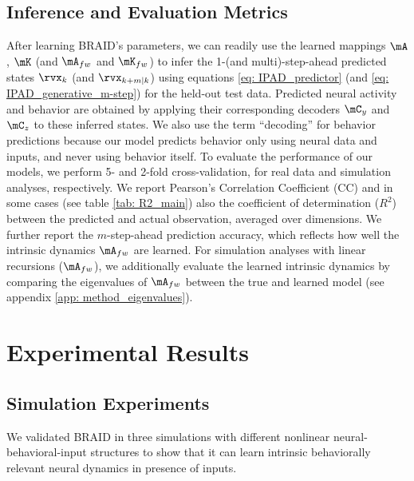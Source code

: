\documentclass{article} %
\newcommand{\ourmethod}{BRAID}
\begin{document}
\subsection{Inference and Evaluation Metrics}
After learning \ourmethod{}'s parameters, we can readily use the learned mappings \(\mA\), \(\mK\) (and \(\mA_{fw}\) and \(\mK_{fw}\)) to infer the 1-(and multi)-step-ahead predicted states \(\rvx_{k}\) (and \(\rvx_{k+m|k}\)) using equations \ref{eq: IPAD_predictor} (and \ref{eq: IPAD_generative_m-step}) for the held-out test data. Predicted neural activity and behavior are obtained by applying their corresponding decoders \(\mC_{y}\) and \(\mC_{z}\) to these inferred states. We also use the term ``decoding'' for behavior predictions because our model predicts behavior only using neural data and inputs, and never using behavior itself. To evaluate the performance of our models, we perform 5- and 2-fold cross-validation, for real data and simulation analyses, respectively. 
We report Pearson's Correlation Coefficient (CC) and in some cases (see table \ref{tab: R2_main}) also the coefficient of determination ($R^2$) between the predicted and actual observation, averaged over dimensions. 
We further report the $m$-step-ahead prediction accuracy, which reflects how well the intrinsic dynamics \(\mA_{fw}\) are learned. 
For simulation analyses with linear recursions (\(\mA_{fw}\)), we additionally evaluate the learned intrinsic dynamics by comparing the eigenvalues of \(\mA_{fw}\) between the true and learned model (see appendix \ref{app: method_eigenvalues}).


\section{Experimental Results}

\subsection{Simulation Experiments}
We validated \ourmethod{} in three simulations with different nonlinear neural-behavioral-input structures to show that it can learn intrinsic behaviorally relevant neural dynamics in presence of inputs. 
\end{document}
